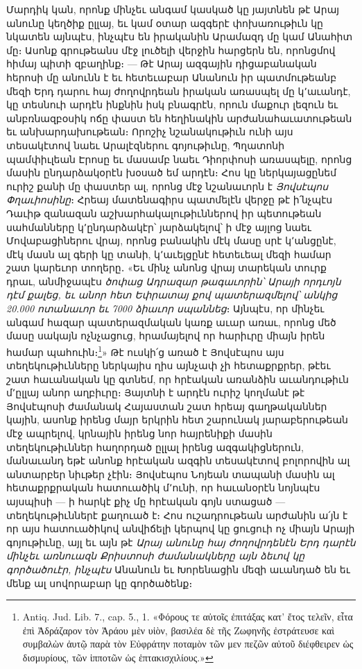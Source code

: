 \documentclass{article}
\begin{document}
{Մարդիկ կան, որոնք մինչեւ անգամ կասկած կը յայտնեն թէ Արայ անունը կեղծիք ըլլայ, եւ կամ օտար ազգերէ փոխառութիւն կը նկատեն այնպէս, ինչպէս են իրականին Արամազդ մը կամ Անահիտ մը։ Ասոնք գրութեանս մէջ լուծելի վերջին հարցերն են, որոնցմով հիմայ պիտի զբաղինք։ — Թէ Արայ ազգային դիցաբանական հերոսի մը անունն է եւ հետեւաբար Անանուն իր պատմութեանբ մեզի Երդ դարու հայ ժողովրդեան իրական առասպել մը կ՚աւանդէ, կը տեսնուի արդէն ինքնին իսկ բնագրէն, որուն մաքուր լեզուն եւ անբռնազբօսիկ ոճը փաստ են հեղինակին արժանահաւատութեան եւ անխարդախութեան։ Որոշիչ նշանակութիւն ունի այս տեսակէտով նաեւ Արալէզներու գոյութիւնը, Պղատոնի պամփիւլեան Էրոսը եւ մասամբ նաեւ Դիորփոսի առասպելը, որոնց մասին ընդարձակօրէն խօսած եմ արդէն։ Հոս կը ներկայացընեմ ուրիշ քանի մը փաստեր ալ, որոնց մէջ նշանաւորն է \emph{Յովսէպոս Փղաւիոսինը}։ Հրեայ մատենագիրս պատմելէն վերջը թէ ի՛նչպէս Դաւիթ զանազան աշխարհակալութիւններով իր պետութեան սահմանները կ՚ընդարձակէր՝ յարձակելով՝ ի մէջ այլոց նաեւ Մովաբացիներու վրայ, որոնց բանակին մէկ մասը սրէ կ՚անցընէ, մէկ մասն ալ գերի կը տանի, կ՚աւելցընէ հետեւեալ մեզի համար շատ կարեւոր տողերը․ «Եւ մինչ անոնց վրայ տարեկան տուրք դրաւ, անմիջապէս \emph{ծոփաց Ադրազար թագաւորին՝ Արայի որդւոյն դէմ քալեց, եւ անոր հետ Եփրատայ քով պատերազմելով՝ անկից 20.000 ոտանաւոր եւ 7000 ձիաւոր սպաննեց}։ Այնպէս, որ մինչեւ անգամ հազար պատերազմական կառք աւար առաւ, որոնց մեծ մասը սակայն ոչնչացուց, հրամայելով որ հարիւրը միայն իրեն համար պահուին։\footnote{Antiq. Jud. Lib. 7., cap. 5., 1. «Φόρους τε αὐτοῖς ἐπιτάξας κατ' ἔτος τελεῖν, εἶτα ἐπὶ Ἀδράζαρον τὸν Ἀράου μὲν υἱὸν, βασιλέα δὲ τῆς Ζωφηνῆς ἐστράτευσε καὶ συμβαλὼν ἀυτῷ παρὰ τὸν Εὐφράτην ποταμὸν τῶν μεν πεζῶν αὐτοῦ διέφθειρεν ὡς δισμυρίους, τῶν ἱπποτῶν ὡς ἑπτακισχιλίους.»}» Թէ ուսկի՛ց առած է Յովսէպոս այս տեղեկութիւնները ներկայիս ղիս այնչափ չի հետաքրքրեր, թէեւ շատ հաւանական կը գտնեմ, որ հրէական առանձին աւանդութիւն մ՚ըլլայ անոր աղբիւրը։ Յայտնի է արդէն ուրիշ կողմանէ թէ Յովսէպոսի ժամանակ Հայաստան շատ հրեայ գաղթականներ կային, ասոնք իրենց մայր երկրին հետ շարունակ յարաբերութեան մէջ ապրելով, կրնային իրենց նոր հայրենիքի մասին տեղեկութիւններ հաղորդած ըլլալ իրենց ազգակիցներուն, մանաւանդ եթէ անոնք հրէական ազգին տեսակէտով բոլորովին ալ անտարբեր նիւթեր չէին։ Յովսէպոս Նոյեան տապանի մասին ալ հետաքրքրական հատուածիկ մ՚ունի, որ հաւանօրէն նոյնպէս այսպիսի — ի հարկէ քիչ մը հրէական գոյն ստացած — տեղեկութիւններէ քաղուած է։ Հոս ուշադրութեան արժանին ա՛յն է որ այս հատուածիկով անվիճելի կերպով կը ցուցուի ոչ միայն Արայի գոյութիւնը, այլ եւ այն թէ \emph{Արայ անունը հայ ժողովրդենէն Երդ դարէն մինչեւ առնուազն Քրիստոսի ժամանակները այն ձեւով կը գործածուէր, ինչպէս} Անանուն եւ Խորենացին մեզի աւանդած են եւ մենք ալ սովորաբար կը գործածենք։

}
\end{document}
